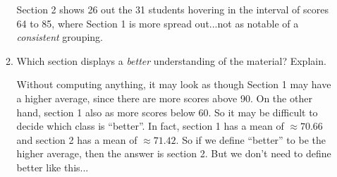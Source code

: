 \documentclass{article}
\newcommand{\answer}[1]{\color{white}#1}
\begin{document}
\begin{enumerate}
\begin{enumerate}
	{\answer{Section 2 shows 26 out the 31 students hovering in the interval of scores 64 to 85, where Section 1 is more spread out...not as notable of a {\em consistent} grouping.}} 
	
	\item Which section displays a {\em better} understanding of the material?  Explain.
	
	{\answer{Without computing anything, it may look as though Section 1 may have a higher average, since there are more scores above 90. On the other hand, section 1 also as more scores below 60. So it may be difficult to decide which class is ``better''. In fact, section 1 has a mean of $\approx 70.66$ and section 2 has a mean of $\approx 71.42$. So if we define ``better'' to be the higher average, then the answer is section 2. But we don't need to define better like this...}}
	\end{enumerate}
	
\end{enumerate}

\vfill
\end{document}
